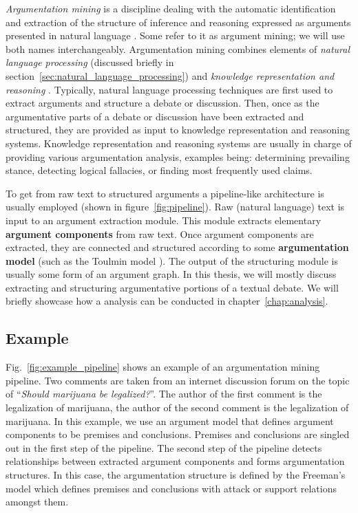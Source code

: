 \emph{Argumentation mining} is a discipline dealing with the automatic
identification and extraction of the structure of inference and reasoning
expressed as arguments presented in natural language
\citep{lawrence2019argument}.  Some refer to it as argument mining; we will use
both names interchangeably.  Argumentation mining combines elements of
\emph{natural language processing} (discussed briefly in
section~\ref{sec:natural_language_processing}) and \emph{knowledge
representation and reasoning} \citep{cabrio2018five}.  Typically, natural
language processing techniques are first used to extract arguments and
structure a debate or discussion. Then, once as the argumentative parts of a
debate or discussion have been extracted and structured, they are provided as
input to knowledge representation and reasoning systems.  Knowledge
representation and reasoning systems are usually in charge of providing various
argumentation analysis, examples being: determining prevailing stance,
detecting logical fallacies, or finding most frequently used claims.

To get from raw text to structured arguments a pipeline-like architecture
is usually employed (shown in figure~\ref{fig:pipeline}). 
Raw (natural language) text is input to an argument extraction module. This module
extracts elementary \textbf{argument components} from raw text. 
Once argument components are extracted, they are connected and structured 
according to some \textbf{argumentation model} (such as the Toulmin model \citep{toulmin2003uses}).
The output of the structuring module is usually some form of an argument graph. 
In this thesis, we will mostly discuss extracting and structuring argumentative
portions of a textual debate. We will briefly showcase how a analysis can be
conducted in chapter~\ref{chap:analysis}. 

\subsection{Example}


Fig.~\ref{fig:example_pipeline} shows an example of an argumentation mining
pipeline. Two comments are taken from an internet discussion forum on the topic
of ``\emph{Should marijuana be legalized?}''. The author of the first comment
is  the legalization of marijuana, the author of the second
comment is  the legalization of marijuana.  In this example, we use an
argument model that defines argument components to be premises and conclusions.
Premises and conclusions are singled out in the first step of the pipeline.
The second step of the pipeline detects relationships between extracted
argument components and forms argumentation structures. In this case, the
argumentation structure is defined by the Freeman's model
\citep{freeman2011argument} which defines premises and conclusions with attack
or support relations amongst them. 

